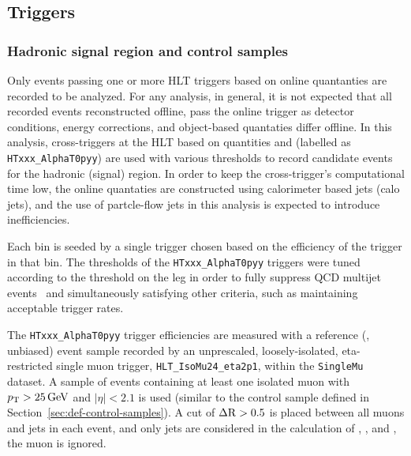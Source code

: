 \subsection{Triggers}

\subsubsection{Hadronic signal region and control samples\label{sec:signal_triggers}} 

Only events passing one or more HLT triggers based on online quantanties 
are recorded to be analyzed. For any analysis, in general, it is 
not expected that all recorded events reconstructed offline, pass the online
trigger as detector conditions, energy corrections, and object-based quantaties
differ offline. In this analysis, cross-triggers at the HLT
based on quantities \scalht and \alphat (labelled as \verb!HTxxx_AlphaT0pyy!) 
are used with various thresholds to record candidate events for the hadronic (signal)
region. In order to keep the cross-trigger's computational time low, the online quantaties
are constructed using calorimeter based jets (calo jets), and the use of
partcle-flow jets in this analysis is expected to introduce inefficiencies.

Each \scalht bin is seeded by a single trigger chosen based on the
efficiency of the trigger in that \scalht bin. The \alphat thresholds of the
\verb!HTxxx_AlphaT0pyy! triggers were tuned according to the threshold
on the \scalht leg in order to fully suppress QCD multijet events~\cite{RA1Paper2012}
and simultaneously satisfying other criteria, such as maintaining
acceptable trigger rates.



%
The \verb!HTxxx_AlphaT0pyy! trigger efficiencies are measured with a
reference (\ie, unbiased) event sample recorded by an unprescaled,
loosely-isolated, eta-restricted single muon 
trigger, \verb!HLT_IsoMu24_eta2p1!, within the \verb!SingleMu! dataset. A
sample of events containing at least one isolated muon with $p_{\mathrm{T}} >
25\,\text{Ge\hspace{-.08em}V}$ and $|\eta| < 2.1$ is used (similar to the \mj control sample
defined in Section~\ref{sec:def-control-samples}). A cut of $\Delta
{\rm R} > 0.5$ is placed between all muons and jets in each event, and
only jets are considered in the calculation of \scalht, \mht, and
\alphat, \ie the muon is ignored.

